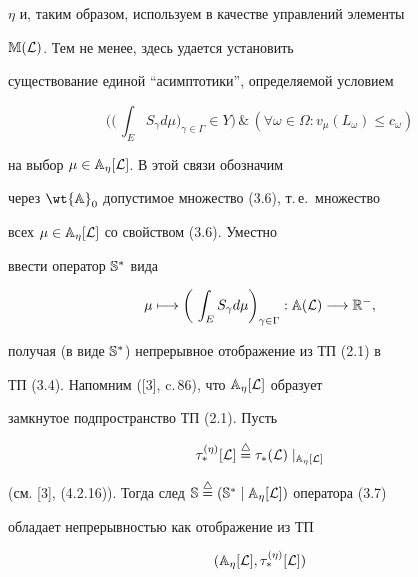 $\eta$ и, таким образом, используем в качестве управлений элементы


$\Bbb M(\cal L)$. Тем не менее, здесь удается установить


существование единой ``асимптотики'', определяемой условием


\begin{equation}


\bigg(\Big(\,\int_E S_\gamma d\mu\Big)_{\gamma \in \Gamma} \in Y\bigg)\,\&\,


(\forall\omega\in\Omega:v_\mu(L_\omega)\le c_\omega)


\end{equation}


на выбор $\mu\in\Bbb A_\eta[\cal L]$. В этой связи обозначим


через $\wt{\Bbb A}_0$ допустимое множество (3.6), т.\,е.~множество


всех $\mu\in\Bbb A_\eta[\cal L]$ со свойством (3.6). Уместно


ввести оператор $\Bbb S^*$ вида


\begin{equation}


\mu\longmapsto\bigg(\,\int_E S_\gamma d\mu\bigg)_{\gamma \in \Gamma}:


\Bbb A(\cal L)\longrightarrow\Bbb R^\Gamma,


\end{equation}


получая (в виде $\Bbb S^*$) непрерывное отображение из ТП (2.1) в


ТП (3.4). Напомним ([3], c.\,86), что $\Bbb A_\eta[\cal L]$ образует


замкнутое подпространство ТП (2.1). Пусть


$$


\tau^{(\eta)}_*[\cal L]\overset{\triangle}{=}{}


\tau_*(\cal L) \mid_{\Bbb A_\eta[\cal L]}


$$


(см. [3], (4.2.16)). Тогда след $\Bbb S\overset{\triangle}{=}{}


(\Bbb S^* \mid \Bbb A_\eta[\cal L])$ оператора (3.7)


обладает непрерывностью как отображение из ТП


\begin{equation}


(\Bbb A_\eta[\cal L],\tau^{(\eta)}_*[\cal L])


\end{equation}


